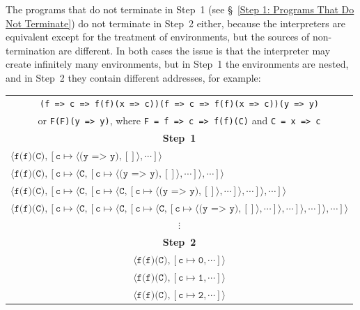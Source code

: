 \documentclass[12pt, oneside]{book}
\begin{document}
The programs that do not terminate in Step~1 (see §~\ref{Step 1: Programs That Do Not Terminate}) do not terminate in Step~2 either, because the interpreters are equivalent except for the treatment of environments, but the sources of non-termination are different. In both cases the issue is that the interpreter may create infinitely many environments, but in Step~1 the environments are nested, and in Step~2 they contain different addresses, for example:

\begin{center}
\begin{tabular}{l}
\multicolumn{1}{c}{\texttt{(f => c => f(f)(x => c))(f => c => f(f)(x => c))(y => y)}} \\
\multicolumn{1}{c}{or \texttt{F(F)(y => y)}, where \texttt{F = f => c => f(f)(C)} and \texttt{C = x => c}} \\
\multicolumn{1}{c}{\textbf{Step~1}} \\
$\langle \texttt{f(f)(C)}, [\texttt{c} \mapsto \langle \texttt{(y => y)}, [] \rangle, \cdots] \rangle$ \\
$\langle \texttt{f(f)(C)}, [\texttt{c} \mapsto \langle \texttt{C}, [\texttt{c} \mapsto \langle \texttt{(y => y)}, [] \rangle, \cdots] \rangle, \cdots] \rangle$ \\
$\langle \texttt{f(f)(C)}, [\texttt{c} \mapsto \langle \texttt{C}, [\texttt{c} \mapsto \langle \texttt{C}, [\texttt{c} \mapsto \langle \texttt{(y => y)}, [] \rangle, \cdots] \rangle, \cdots] \rangle, \cdots] \rangle$ \\
$\langle \texttt{f(f)(C)}, [\texttt{c} \mapsto \langle \texttt{C}, [\texttt{c} \mapsto \langle \texttt{C}, [\texttt{c} \mapsto \langle \texttt{C}, [\texttt{c} \mapsto \langle \texttt{(y => y)}, [] \rangle, \cdots] \rangle, \cdots] \rangle, \cdots] \rangle, \cdots] \rangle$ \\
\multicolumn{1}{c}{$\vdots$} \\
\multicolumn{1}{c}{\textbf{Step~2}} \\
\multicolumn{1}{c}{$\langle \texttt{f(f)(C)}, [\texttt{c} \mapsto \texttt{0}, \cdots] \rangle$} \\
\multicolumn{1}{c}{$\langle \texttt{f(f)(C)}, [\texttt{c} \mapsto \texttt{1}, \cdots] \rangle$} \\
\multicolumn{1}{c}{$\langle \texttt{f(f)(C)}, [\texttt{c} \mapsto \texttt{2}, \cdots] \rangle$} \\

\end{tabular}
\end{center}
\end{document}
